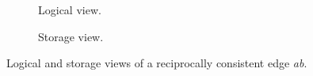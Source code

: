 \begin{figure}[htp]
  \centering
  \begin{subfigure}{\linewidth}
    \centering
    
    \caption{Logical view.}
    \label{rc-edge}
  \end{subfigure}
  \begin{subfigure}{\linewidth}
    \vspace{2ex}
    \centering
    
    \caption{Storage view.}
    \label{db-rep}
  \end{subfigure}%
  \caption{Logical and storage views of a reciprocally consistent edge \emph{ab}.}
  \label{rc}
\end{figure}